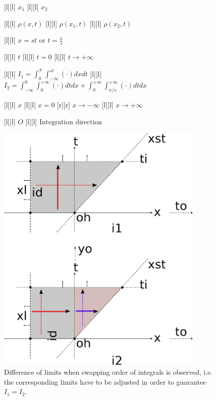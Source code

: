 \begin{figure}[ht]
	\centering
	\footnotesize


	[l] {$x_1$}
	[l] {$x_2$}

	[l] {$\rho(x,t)$}
	[l] {$\rho(x_{1},t)$}
	[l] {$\rho(x_{2},t)$}

	[l] {$\displaystyle x=st\text{ or }t=\frac{x}{s}$}

	[l] {$t$}
	[l] {$t = 0$}
	[l] {$t \rightarrow +\infty$}


	[l] {$\displaystyle I_{1} = \int_{0}^{\mathscr{T}}\int_{-\infty}^{st} \left(\cdot\right)dxdt$}
	[l] {$\displaystyle I_{2}
			=
			\int_{-\infty}^{0}\int_{0}^{+\infty} \left(\cdot\right)dtdx
			+
			\int_{0}^{+\infty}\int_{x/s}^{+\infty} \left(\cdot\right)dtdx
		$}

	[l] {$x$}
	[l] {$x=0$}
	[r] {$x\rightarrow -\infty$}
	[l] {$x\rightarrow +\infty$}

	[l] {$O$}
	[l] {$\text{Integration direction}$}

	\includegraphics[width=0.9\textwidth]{orderintegraluLR.eps}
	\caption{Difference of limits when swapping order of integrals is observed, i.e. the corresponding limits
		have to be adjusted in order to guarantee $I_{1} = I_{2}$.}
	\label{\LABEL}
\end{figure}
